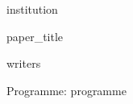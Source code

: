\begin{titlepage}\centering
{\Large {{institution}}\par}\vfill
{\Huge {{paper_title}}\par}\vfill
{{writers}}\par
Programme: {{programme}}\par
\end{titlepage}
